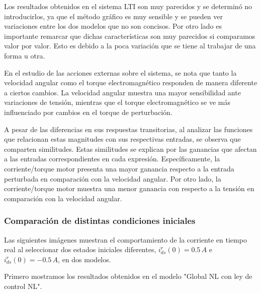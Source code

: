 \documentclass{article}
\begin{document}
Los resultados obtenidos en el sistema LTI son muy parecidos y se determinó no introducirlos, ya 
que el método gráfico es muy sensible y se pueden ver variaciones entre los dos modelos que no 
son concisos. Por otro lado es importante remarcar que dichas características son muy parecidos 
si comparamos valor por valor. Esto es debido a la poca variación que se tiene al trabajar de una 
forma u otra. 

En el estudio de las acciones externas sobre el sistema, se nota que tanto la velocidad angular como 
el torque electromagnético responden de manera diferente a ciertos cambios. La velocidad angular
muestra una mayor sensibilidad ante variaciones de tensión, mientras que el torque electromagnético 
se ve más influenciado por cambios en el torque de perturbación.

A pesar de las diferencias en sus respuestas transitorias, al analizar las funciones que relacionan 
estas magnitudes con sus respectivas entradas, se observa que comparten similitudes. Estas similitudes 
se explican por las ganancias que afectan a las entradas correspondientes en cada expresión. 
Específicamente, la corriente/torque motor presenta una mayor ganancia respecto a la entrada perturbada 
en comparación con la velocidad angular. Por otro lado, la corriente/torque motor muestra una menor 
ganancia con respecto a la tensión en comparación con la velocidad angular.

\subsubsection{Comparación de distintas condiciones iniciales}

Las siguientes imágenes muestran el comportamiento de la corriente en tiempo real al seleccionar dos 
estados iniciales diferentes, $i^r_{ds}(0) = 0.5 \, A$ e $i^r_{ds}(0) = -0.5 \, A$, en dos modelos.

Primero mostramos los resultados obtenidos en el modelo "Global NL con ley de control NL".
\end{document}
